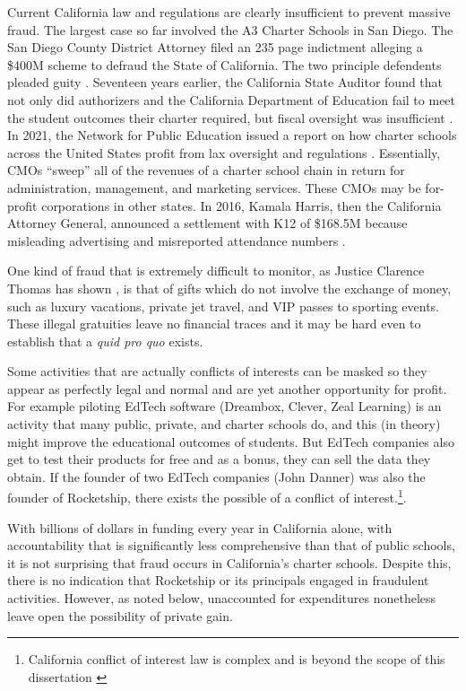 Current California law and regulations are clearly insufficient to prevent massive fraud. The largest case so far involved the A3 Charter Schools in San Diego. The San Diego County District Attorney filed an 235 page indictment \parencite{SDDA2019} alleging a \$400M scheme to defraud the State of California. The two principle defendents pleaded guity \parencite{Taketa2021}.
Seventeen years earlier, the California State Auditor found that not only did authorizers and the California Department of Education fail to meet the student outcomes their charter required, but fiscal oversight was insufficient \parencite{CAStateAuditor2002}. In 2021, the Network for Public Education issued a report on how charter schools across the United States profit from lax oversight and regulations \parencite{Burris.Cimarusti2021}. Essentially, CMOs ``sweep'' all of the revenues of a charter school chain in return for administration, management, and marketing services. These CMOs may be for-profit corporations in other states. In 2016, Kamala Harris, then the California Attorney General, announced a settlement with K12 of \$168.5M because misleading advertising and misreported attendance numbers \parencite{Agpressoffice2016}.

One kind of fraud that is extremely difficult to monitor, as Justice Clarence Thomas has shown \parencite{Murphy.Mierjeski2023}, is that of gifts which do not involve the exchange of money, such as luxury vacations, private jet travel, and VIP passes to sporting events. These illegal gratuities leave no financial traces and it may be hard even to establish that a \textit{quid pro quo} exists. 

Some activities that are actually conflicts of interests can be masked so they appear as perfectly legal and normal and are yet another opportunity for profit. For example piloting EdTech software (Dreambox, Clever, Zeal Learning) is an activity that many public, private, and charter schools do, and this (in theory) might improve the educational outcomes of students. But EdTech companies also get to test their products for free and as a bonus, they can sell the data they obtain. If the founder of two EdTech companies (John Danner) was also the founder of Rocketship, there exists the possible of a conflict of interest.\footnote{California conflict of interest law is complex and is beyond the scope of this dissertation \parencite{Chaney.etal2010}}.

With billions of dollars in funding every year in California alone, with accountability that is significantly less comprehensive than that of public schools, it is not surprising that fraud occurs in California's charter schools. Despite this, there is no indication that Rocketship or its principals engaged in fraudulent activities. However, as noted below, unaccounted for expenditures nonetheless leave open the possibility of private gain. 


